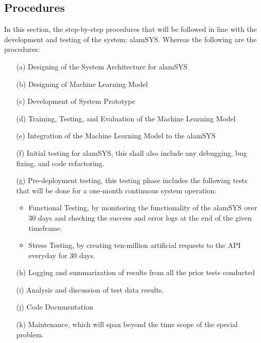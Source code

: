 \subsection{Procedures}
\label{subsec:procedures}
In this section, the step-by-step procedures that 
will be followed in line with the development and testing of the system; 
alamSYS. Whereas the following are the procedures:
\begin{itemize}
    \item[(a)]	Designing of the System Architecture for alamSYS
    \item[(b)]	Designing of Machine Learning Model
    \item[(c)]	Development of System Prototype
    \item[(d)]	Training, Testing, and Evaluation of the Machine Learning Model
    \item[(e)]	Integration of the Machine Learning Model to the alamSYS
    \item[(f)]	Initial testing for alamSYS, this shall also include any debugging, 
    bug fixing, and code refactoring.
    \item[(g)]	Pre-deployment testing, this testing phase includes the 
    following tests that will be done for a one-month continuous system operation:
        \begin{itemize}
            \item Functional Testing, by monitoring the functionality of 
            the alamSYS over 30 days and checking the success and error logs at 
            the end of the given timeframe.
            \item Stress Testing, by creating ten-million artificial requests 
            to the API everyday for 30 days.
        \end{itemize}
    \item[(h)]	Logging and summarization of results from all the prior 
    tests conducted
    \item[(i)]	Analysis and discussion of test data results.
    \item[(j)]	Code Documentation
    \item[(k)]	Maintenance, which will span beyond the time scope of the 
    special problem.
\end{itemize}




